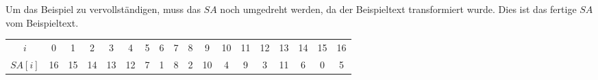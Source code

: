 Um das Beispiel zu vervollständigen, muss das $SA$ noch umgedreht werden, da der Beispieltext transformiert wurde. Dies ist das fertige $SA$ vom Beispieltext.

\begin{table}[H]
	\centering
	\begin{tabular}{c| c c c c c c c c c c c c c c c c c}
		$i$ & 0 & 1 & 2 & 3 & 4 & 5 & 6 & 7 & 8 & 9 & 10 & 11 & 12 & 13 & 14 & 15 & 16 \\
		$SA[i]$ & 16 & 15 & 14 & 13 & 12 & 7 & 1 & 8 & 2 & 10 & 4 & 9 & 3 & 11 & 6 & 0 & 5 
	\end{tabular}
\end{table}
